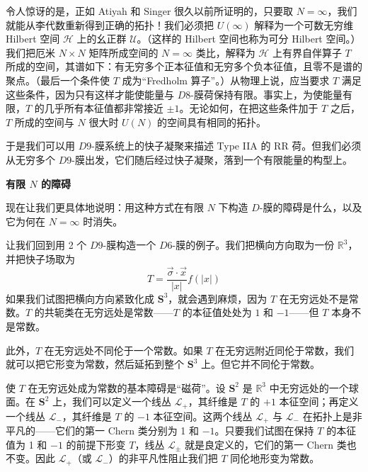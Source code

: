 令人惊讶的是，正如 Atiyah 和 Singer 很久以前所证明的，只要取 \(N=\infty\)，我们就能从李代数重新得到正确的拓扑！我们必须把 \(U(\infty)\) 解释为一个可数无穷维 Hilbert 空间 \({\mathcal H}\) 上的幺正群 \({\mathcal U}\)。（这样的 Hilbert 空间也称为可分 Hilbert 空间。）我们把厄米 \(N\times N\) 矩阵所成空间的 \(N=\infty\) 类比，解释为 \({\mathcal H}\) 上有界自伴算子 \(T\) 所成的空间，其谱如下：有无穷多个正本征值和无穷多个负本征值，且零不是谱的聚点。（最后一个条件使 \(T\) 成为“Fredholm 算子”。）从物理上说，应当要求 \(T\) 满足这些条件，因为只有这样才能使能量与 \(D8\)-膜荷保持有限。事实上，为使能量有限，\(T\) 的几乎所有本征值都非常接近 \(\pm 1\)。无论如何，在把这些条件加于 \(T\) 之后，\(T\) 所成的空间与 \(N\) 很大时 \(U(N)\) 的空间具有相同的拓扑。

于是我们可以用 \(D9\)-膜系统上的快子凝聚来描述 Type IIA 的 RR 荷。但我们必须从无穷多个 \(D9\)-膜出发，它们随后经过快子凝聚，落到一个有限能量的构型上。

\textbf{有限 \(N\) 的障碍}

现在让我们更具体地说明：用这种方式在有限 \(N\) 下构造 \(D\)-膜的障碍是什么，以及它为何在 \(N=\infty\) 时消失。

让我们回到用 2 个 \(D9\)-膜构造一个 \(D6\)-膜的例子。我们把横向方向取为一份 \(\mathbb{R}^3\)，并把快子场取为 \begin{equation}\tag{3.3}\label{eq:3.3}
T=\frac{\vec\sigma\cdot\vec x}{|x|}f(|x|)
\end{equation} 如果我们试图把横向方向紧致化成 \({\mathbf S}^3\)，就会遇到麻烦，因为 \(T\) 在无穷远处不是常数。\(T\) 的共轭类在无穷远处是常数——\(T\) 的本征值处处为 \(1\) 和 \(-1\)——但 \(T\) 本身不是常数。

此外，\(T\) 在无穷远处不同伦于一个常数。如果 \(T\) 在无穷远附近同伦于常数，我们就可以把它形变为常数，然后延拓到整个 \({\mathbf S}^3\) 上。但它并不同伦于常数。

使 \(T\) 在无穷远处成为常数的基本障碍是“磁荷”。设 \({\mathbf S}^2\) 是 \(\mathbb{R}^3\) 中无穷远处的一个球面。在 \({\mathbf S}^2\) 上，我们可以定义一个线丛 \({\mathcal L}_+\)，其纤维是 \(T\) 的 \(+1\) 本征空间；再定义一个线丛 \({\mathcal L}_-\)，其纤维是 \(T\) 的 \(-1\) 本征空间。这两个线丛 \({\mathcal L}_+\) 与 \({\mathcal L}_-\) 在拓扑上是非平凡的——它们的第一 Chern 类分别为 1 和 \(-1\)。只要我们试图在保持 \(T\) 的本征值为 1 和 \(-1\) 的前提下形变 \(T\)，线丛 \({\mathcal L}_\pm\) 就是良定义的，它们的第一 Chern 类也不变。因此 \({\mathcal L}_+\)（或 \({\mathcal L}_-\)）的非平凡性阻止我们把 \(T\) 同伦地形变为常数。

